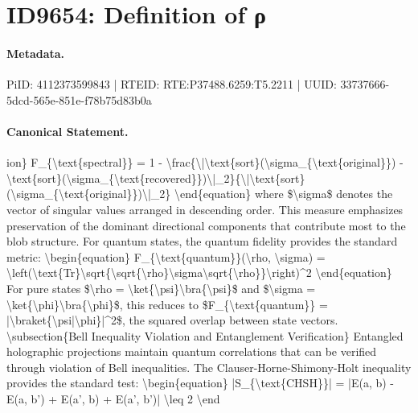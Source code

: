 \section*{ID9654: Definition of ρ}
\paragraph{Metadata.}
PiID: 4112373599843 | RTEID: RTE:P37488.6259:T5.2211 | UUID: 33737666-5dcd-565e-851e-f78b75d83b0a

\paragraph{Canonical Statement.}
ion\} F\_\{\textbackslash{}text\{spectral\}\} = 1 - \textbackslash{}frac\{\textbackslash{}|\textbackslash{}text\{sort\}(\textbackslash{}sigma\_\{\textbackslash{}text\{original\}\}) - \textbackslash{}text\{sort\}(\textbackslash{}sigma\_\{\textbackslash{}text\{recovered\}\})\textbackslash{}|\_2\}\{\textbackslash{}|\textbackslash{}text\{sort\}(\textbackslash{}sigma\_\{\textbackslash{}text\{original\}\})\textbackslash{}|\_2\} \textbackslash{}end\{equation\} where \$\textbackslash{}sigma\$ denotes the vector of singular values arranged in descending order. This measure emphasizes preservation of the dominant directional components that contribute most to the blob structure. For quantum states, the quantum fidelity provides the standard metric: \textbackslash{}begin\{equation\} F\_\{\textbackslash{}text\{quantum\}\}(\textbackslash{}rho, \textbackslash{}sigma) = \textbackslash{}left(\textbackslash{}text\{Tr\}\textbackslash{}sqrt\{\textbackslash{}sqrt\{\textbackslash{}rho\}\textbackslash{}sigma\textbackslash{}sqrt\{\textbackslash{}rho\}\}\textbackslash{}right)\textasciicircum{}2 \textbackslash{}end\{equation\} For pure states \$\textbackslash{}rho = \textbackslash{}ket\{\textbackslash{}psi\}\textbackslash{}bra\{\textbackslash{}psi\}\$ and \$\textbackslash{}sigma = \textbackslash{}ket\{\textbackslash{}phi\}\textbackslash{}bra\{\textbackslash{}phi\}\$, this reduces to \$F\_\{\textbackslash{}text\{quantum\}\} = |\textbackslash{}braket\{\textbackslash{}psi|\textbackslash{}phi\}|\textasciicircum{}2\$, the squared overlap between state vectors. \textbackslash{}subsection\{Bell Inequality Violation and Entanglement Verification\} Entangled holographic projections maintain quantum correlations that can be verified through violation of Bell inequalities. The Clauser-Horne-Shimony-Holt inequality provides the standard test: \textbackslash{}begin\{equation\} |S\_\{\textbackslash{}text\{CHSH\}\}| = |E(a, b) - E(a, b') + E(a', b) + E(a', b')| \textbackslash{}leq 2 \textbackslash{}end

